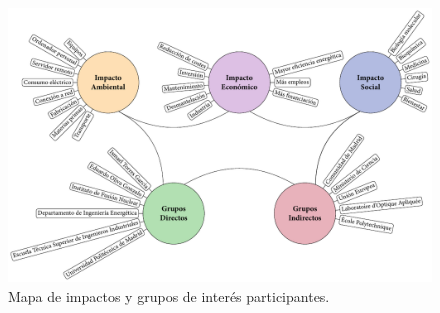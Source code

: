 \begin{figure}[htbp]
  \centering
  \includegraphics[width=\textwidth]{Figuras/ch6_impcts.pdf}
  \caption{Mapa de impactos y grupos de interés participantes.}
  \label{fig:6.1}
\end{figure}
